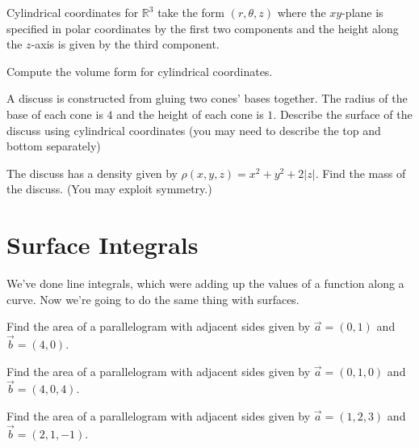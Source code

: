 \documentclass{problemset}
\newcommand{\R}{\mathbb{R}}
\begin{document}
	\question
	Cylindrical coordinates for $\R^3$ take the form $(r,\theta, z)$ where the
	$xy$-plane is specified in polar coordinates by the first two components
	and the height along the $z$-axis
	is given by the third component.
	\begin{parts}
		\item Compute the volume form for cylindrical coordinates.
		\item A discuss is constructed from gluing two cones' bases together.
			The radius of the base of each cone is $4$ and the height of each
			cone is $1$.  Describe the surface of the discuss using cylindrical coordinates
			(you may need to describe the top and bottom separately)
		\item The discuss has a density given by $\rho(x,y,z) = x^2+y^2+2|z|$.  Find the
			mass of the discuss. (You may exploit symmetry.)
	\end{parts}

\newpage
\section*{Surface Integrals}
	We've done line integrals, which were adding up the values of a function along a curve.
	Now we're going to do the same thing with surfaces.

	\question
	\begin{parts}
		\item Find the area of a parallelogram with adjacent sides given by $\vec a=(0,1)$ and $\vec b=(4,0)$.
		\item Find the area of a parallelogram with adjacent sides given by $\vec a=(0,1,0)$ and $\vec b=(4,0,4)$.
		\item Find the area of a parallelogram with adjacent sides given by $\vec a=(1,2,3)$ and $\vec b=(2,1,-1)$.
	\end{parts}
\end{document}
